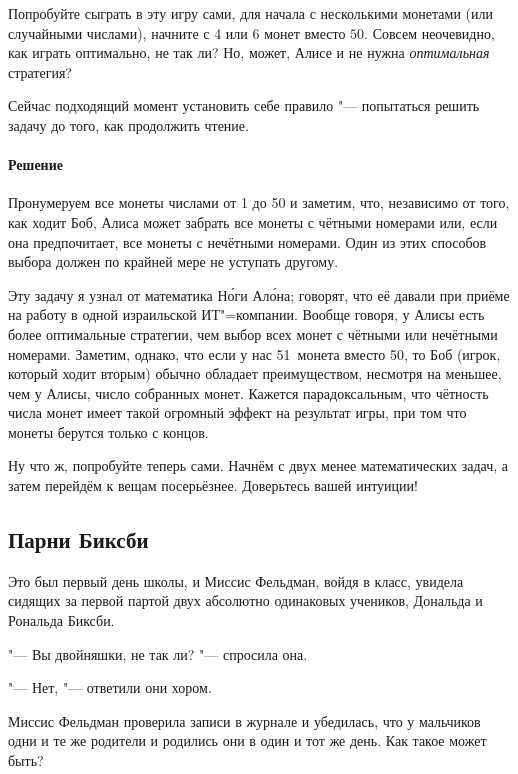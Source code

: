 \documentclass[twoside]{book}
\makeatletter
\newcommand{\rindex}[2][\imki@jobname]{%
  \index[#1]{\detokenize{#2}}%
}
\makeatother
\begin{document}
\medskip

Попробуйте сыграть в эту игру сами, для начала с несколькими монетами (или случайными числами), начните с 4 или 6 монет вместо $50$.
Совсем неочевидно, как играть оптимально, не так ли?
Но, может, Алисе и не нужна \emph{оптимальная} стратегия? 

Сейчас подходящий момент установить себе правило "--- попытаться решить задачу до того, как продолжить чтение.

\paragraph{Решение}
Пронумеруем все монеты числами от 1 до 50 и заметим, что, независимо от того, как ходит Боб, Алиса может забрать все монеты с чётными номерами или, если она предпочитает, все монеты с нечётными номерами.
Один из этих способов выбора должен по крайней мере не уступать другому.
\heart

Эту задачу я узнал от математика Н\'{о}ги Ал\'{о}на;
говорят, что её давали при приёме на работу в одной израильской ИТ"=компании.
Вообще говоря, у Алисы есть более оптимальные стратегии, чем выбор всех монет с чётными или нечётными номерами.
Заметим, однако, что если у нас 51~монета вместо 50, то Боб (игрок, который ходит вторым) обычно обладает преимуществом, несмотря на меньшее, чем у Алисы, число собранных монет.
Кажется парадоксальным, что чётность числа монет имеет такой огромный эффект на результат игры, при том что монеты берутся только с концов.

\medskip

Ну что ж, попробуйте теперь сами.
Начнём с двух менее математических задач, а затем перейдём к вещам посерьёзнее.
Доверьтесь вашей интуиции!

\subsection*{Парни Биксби} %
\rindex{Парни Биксби}

Это был первый день школы, и Миссис Фельдман, войдя в класс, увидела сидящих за первой партой двух абсолютно одинаковых учеников, Дональда и Рональда Биксби.

"--- Вы двойняшки, не так ли? "--- спросила она.

"--- Нет, "--- ответили они хором.

Миссис Фельдман проверила записи в журнале и убедилась, что у мальчиков одни и те же родители и родились они в один и тот же день.
Как такое может быть?
\end{document}
